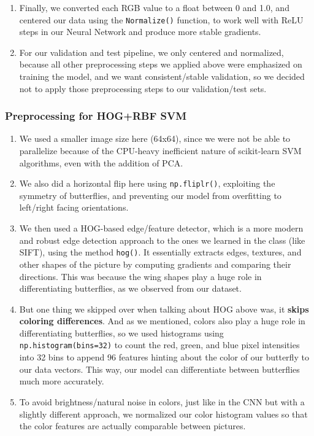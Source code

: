 \documentclass[10pt]{article} %
\begin{document}
\begin{enumerate}
    \item Finally, we converted each RGB value to a float between 0 and 1.0, and centered our data using the \texttt{Normalize()} function, to work well with ReLU steps in our Neural Network and produce more stable gradients.
    \item For our validation and test pipeline, we only centered and normalized, because all other preprocessing steps we applied above were emphasized on training the model, and we want consistent/stable validation, so we decided not to apply those preprocessing steps to our validation/test sets.
\end{enumerate}
\subsubsection{Preprocessing for HOG+RBF SVM}\begin{enumerate}
    \item We used a smaller image size here (64x64), since we were not be able to parallelize because of the CPU-heavy inefficient nature of scikit-learn SVM algorithms, even with the addition of PCA.
    \item We also did a horizontal flip here using \texttt{np.fliplr()}, exploiting the symmetry of butterflies, and preventing our model from overfitting to left/right facing orientations.
    \item We then used a HOG-based edge/feature detector, which is a more modern and robust edge detection approach to the ones we learned in the class (like SIFT), using the method \texttt{hog()}. It essentially extracts edges, textures, and other shapes of the picture by computing gradients and comparing their directions. This was because the wing shapes play a huge role in differentiating butterflies, as we observed from our dataset.
    \item But one thing we skipped over when talking about HOG above was, it \textbf{skips coloring differences}. And as we mentioned, colors also play a huge role in differentiating butterflies, so we used histograms using \texttt{np.histogram(bins=32)} to count the red, green, and blue pixel intensities into 32 bins to append 96 features hinting about the color of our butterfly to our data vectors. This way, our model can differentiate between butterflies much more accurately.
    \item To avoid brightness/natural noise in colors, just like in the CNN but with a slightly different approach, we normalized our color histogram values so that the color features are actually comparable between pictures.

\end{enumerate}
\end{document}
